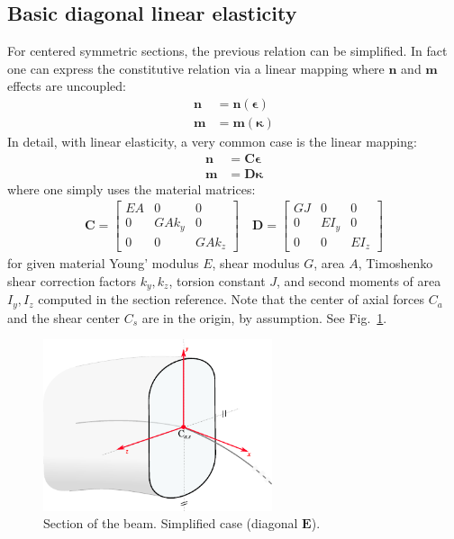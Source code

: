 \documentclass[review]{elsarticle}
\def\avect#1{{\boldsymbol{#1}}}
\def\amatr#1{{\boldsymbol{#1}}}
\begin{document}
\subsection{Basic diagonal linear elasticity}
\label{sec:basic}

For centered symmetric sections, the previous relation can be simplified. In fact one can express the constitutive relation via a linear mapping where $\avect{n}$ and  $\avect{m}$ effects are uncoupled:
%
\begin{align}
\avect{n} &= \avect{n}(\avect{\epsilon}) \\ 
\avect{m} &= \avect{m}(\avect{\kappa})
\label{eq:mn}
\end{align}
%
In detail, with linear elasticity, a very common case is the linear mapping:
%
\begin{align}
\avect{n} &= \amatr{C} \avect{\epsilon}  \\ 
\avect{m} &= \amatr{D} \avect{\kappa} 
\label{eq:mnlin}
\end{align}
%
where one simply uses the material matrices:
%
\begin{align}
	\amatr{C} = 
	\left[  
	\begin{array}{ccc}
	 E A & 0 & 0 \\
	 0 & G A k_y & 0 \\
	 0 & 0 & G A k_z 
	\end{array}
	\right]
	\quad
	\amatr{D} = 
	\left[  
	\begin{array}{ccc}
	 G J & 0 & 0 \\
	 0 & E I_y & 0 \\
	 0 & 0 & E I_z
	\end{array}
	\right]
\end{align}
%
for given material Young' modulus $E$, shear modulus $G$, area $A$, Timoshenko shear correction factors $k_y,k_z$, torsion constant $J$, and second moments of area $I_y, I_z$ computed in the section reference. Note that the center of axial forces $C_a$ and the shear center $C_s$ are in the origin, by assumption. See Fig.~\ref{fig:section_diagonal}.

\begin{figure}[ht]
    \centering
    \includegraphics[width=0.60\textwidth]{section_beam_diagonal.pdf}
    \caption{Section of the beam. Simplified case (diagonal $\amatr{E}$).}
    \label{fig:section_diagonal}
\end{figure}
\end{document}
